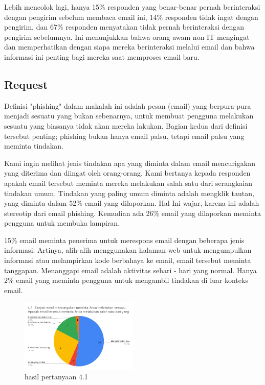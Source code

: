 \documentclass[lettersize,journal]{IEEEtran}
\begin{document}
Lebih mencolok lagi, hanya 15\% responden
yang benar-benar pernah berinteraksi dengan pengirim sebelum membaca email ini, 14\% responden
tidak ingat dengan pengirim, dan 67\% responden menyatakan tidak pernah berinteraksi dengan pengirim
sebelumnya. Ini menunjukkan bahwa orang awam non IT mengingat dan memperhatikan dengan
siapa mereka berinteraksi melalui email dan bahwa informasi ini penting bagi
mereka saat memproses email baru.

\subsection{Request}

Definisi "phishing" dalam makalah ini adalah pesan (email) yang berpura-pura
menjadi sesuatu yang bukan sebenarnya, untuk membuat pengguna melakukan sesuatu
yang biasanya tidak akan mereka lakukan. Bagian kedua dari definisi tersebut
penting; phishing bukan hanya email palsu, tetapi email palsu yang meminta
tindakan.

Kami ingin melihat jenis tindakan apa yang diminta dalam email mencurigakan
yang diterima dan diingat oleh orang-orang. Kami bertanya kepada responden
apakah email tersebut meminta mereka melakukan salah satu dari serangkaian
tindakan umum. Tindakan yang paling umum diminta adalah mengklik tautan, yang
diminta dalam 52\% email yang dilaporkan. Hal Ini wajar, karena ini
adalah stereotip dari email phishing. Kemudian ada 26\%
email yang dilaporkan meminta pengguna untuk membuka lampiran.

15\% email meminta penerima untuk merespons email dengan beberapa jenis informasi. 
Artinya, alih-alih menggunakan halaman web untuk mengumpulkan informasi atau 
melampirkan kode berbahaya ke email, email tersebut meminta tanggapan. 
Menanggapi email adalah aktivitas sehari - hari yang normal. Hanya 2\% email 
yang meminta pengguna untuk mengambil tindakan di luar konteks email. 

\begin{figure}[h!]
  \centering
  \includegraphics[width=0.5\textwidth]{image/4.1.png}
  \caption{hasil pertanyaan 4.1}
  \label{fig:pertanyaan_4.1}
\end{figure}
\end{document}
